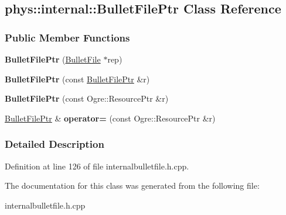 \hypertarget{classphys_1_1internal_1_1BulletFilePtr}{
\subsection{phys::internal::BulletFilePtr Class Reference}
\label{d0/d82/classphys_1_1internal_1_1BulletFilePtr}
}
\subsubsection*{Public Member Functions}
\begin{DoxyCompactItemize}
\item 
\hypertarget{classphys_1_1internal_1_1BulletFilePtr_a63b21053a6a9da4dfe722dee7ed3c4cf}{
{\bfseries BulletFilePtr} (\hyperlink{classphys_1_1internal_1_1BulletFile}{BulletFile} $\ast$rep)}
\label{d0/d82/classphys_1_1internal_1_1BulletFilePtr_a63b21053a6a9da4dfe722dee7ed3c4cf}

\item 
\hypertarget{classphys_1_1internal_1_1BulletFilePtr_ac5c6ddc636686aeb9ed294fa7782c32c}{
{\bfseries BulletFilePtr} (const \hyperlink{classphys_1_1internal_1_1BulletFilePtr}{BulletFilePtr} \&r)}
\label{d0/d82/classphys_1_1internal_1_1BulletFilePtr_ac5c6ddc636686aeb9ed294fa7782c32c}

\item 
\hypertarget{classphys_1_1internal_1_1BulletFilePtr_aa8c26e0d2ae6d61e61c626cd0e468e14}{
{\bfseries BulletFilePtr} (const Ogre::ResourcePtr \&r)}
\label{d0/d82/classphys_1_1internal_1_1BulletFilePtr_aa8c26e0d2ae6d61e61c626cd0e468e14}

\item 
\hypertarget{classphys_1_1internal_1_1BulletFilePtr_a5d283546eaf1a58668389fe5e913166a}{
\hyperlink{classphys_1_1internal_1_1BulletFilePtr}{BulletFilePtr} \& {\bfseries operator=} (const Ogre::ResourcePtr \&r)}
\label{d0/d82/classphys_1_1internal_1_1BulletFilePtr_a5d283546eaf1a58668389fe5e913166a}

\end{DoxyCompactItemize}


\subsubsection{Detailed Description}


Definition at line 126 of file internalbulletfile.h.cpp.



The documentation for this class was generated from the following file:\begin{DoxyCompactItemize}
\item 
internalbulletfile.h.cpp\end{DoxyCompactItemize}

